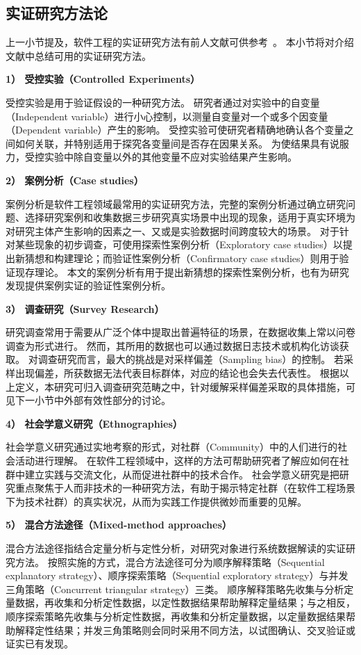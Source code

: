 \subsection{实证研究方法论}
上一小节提及，软件工程的实证研究方法有前人文献可供参考~\cite{easterbrook2008selecting}。
本小节将对介绍文献中总结可用的实证研究方法。

\textbf{1） 受控实验（Controlled Experiments）}

受控实验是用于验证假设的一种研究方法。
研究者通过对实验中的自变量（Independent variable）进行小心控制，以测量自变量对一个或多个因变量（Dependent variable）产生的影响。
受控实验可使研究者精确地确认各个变量之间如何关联，并特别适用于探究各变量间是否存在因果关系。
为使结果具有说服力，受控实验中除自变量以外的其他变量不应对实验结果产生影响。

\textbf{2） 案例分析（Case studies）}

案例分析是软件工程领域最常用的实证研究方法，完整的案例分析通过确立研究问题、选择研究案例和收集数据三步研究真实场景中出现的现象，适用于真实环境为对研究主体产生影响的因素之一、又或是实验数据时间跨度较大的场景。
对于针对某些现象的初步调查，可使用探索性案例分析（Exploratory case studies）以提出新猜想和构建理论；而验证性案例分析（Confirmatory case studies）则用于验证现存理论。
本文的案例分析有用于提出新猜想的探索性案例分析，也有为研究发现提供案例实证的验证性案例分析。

\textbf{3） 调查研究（Survey Research）}

研究调查常用于需要从广泛个体中提取出普遍特征的场景，在数据收集上常以问卷调查为形式进行。
然而，其所用的数据也可以通过数据日志技术或机构化访谈获取。
对调查研究而言，最大的挑战是对采样偏差（Sampling bias）的控制。
若采样出现偏差，所获数据无法代表目标群体，对应的结论也会失去代表性。
根据以上定义，本研究可归入调查研究范畴之中，针对缓解采样偏差采取的具体措施，可见下一小节中外部有效性部分的讨论。

\textbf{4） 社会学意义研究（Ethnographies）}

社会学意义研究通过实地考察的形式，对社群（Community）中的人们进行的社会活动进行理解。
在软件工程领域中，这样的方法可帮助研究者了解应如何在社群中建立实践与交流文化，从而促进社群中的技术合作。
社会学意义研究是把研究重点聚焦于人而非技术的一种研究方法，有助于揭示特定社群（在软件工程场景下为技术社群）的真实状况，从而为实践工作提供微妙而重要的见解。

\textbf{5） 混合方法途径（Mixed-method approaches）}

混合方法途径指结合定量分析与定性分析，对研究对象进行系统数据解读的实证研究方法。
按照实施的方式，混合方法途径可分为顺序解释策略（Sequential explanatory strategy）、顺序探索策略（Sequential exploratory strategy）与并发三角策略（Concurrent triangular strategy）三类。
顺序解释策略先收集与分析定量数据，再收集和分析定性数据，以定性数据结果帮助解释定量结果；与之相反，顺序探索策略先收集与分析定性数据，再收集和分析定量数据，以定量数据结果帮助解释定性结果；并发三角策略则会同时采用不同方法，以试图确认、交叉验证或证实已有发现。

